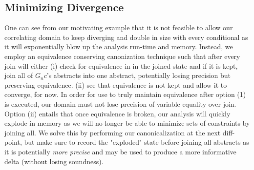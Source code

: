 \subsection{Minimizing Divergence}
One can see from our motivating example that it is not feasible to allow our correlating domain to keep diverging and double in size with every conditional as it will exponentially blow up the analysis run-time and memory. Instead, we employ an equivalence conserving canonization technique such that after every join will either (i) check for equivalence in in the joined state and if it is kept, join all of $G_nc$'s abstracts into one abstract, potentially losing precision but preserving equivalence. (ii) see that equivalence is not kept and allow it to converge, for now. In order for use to truly maintain equivalence after option (1) is executed, our domain must not lose precision of variable equality over join. Option (ii) entails that once equivalence is broken, our analysis will quickly explode in memory as we will no longer be able to minimize sets of constraints by joining all. We solve this by performing our canonicalization at the next diff-point, but make sure to record the "exploded" state before joining all abstracts as it is potentially \emph{more precise} and may be used to produce a more informative delta (without losing soundness).
